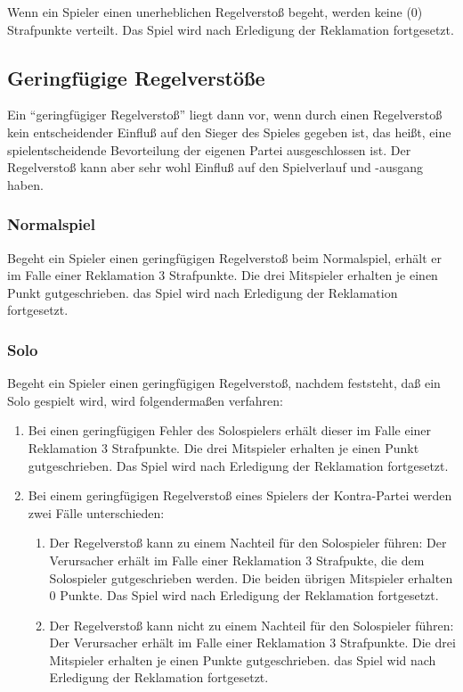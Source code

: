 \documentclass[12pt]{scrartcl}
\begin{document}
Wenn ein Spieler einen unerheblichen Regelverstoß begeht, werden
keine (0) Strafpunkte verteilt. Das Spiel wird nach Erledigung
der Reklamation fortgesetzt.

\subsection{Geringfügige Regelverstöße}
Ein "`geringfügiger Regelverstoß"' liegt dann vor, wenn durch
einen Regelverstoß kein entscheidender Einfluß auf den Sieger
des Spieles gegeben ist, das heißt, eine spielentscheidende
Bevorteilung der eigenen Partei ausgeschlossen ist. Der
Regelverstoß kann aber sehr wohl Einfluß auf den Spielverlauf
und -ausgang haben.

\subsubsection{Normalspiel}
Begeht ein Spieler einen geringfügigen Regelverstoß
beim Normalspiel, erhält er im Falle einer Reklamation 3
Strafpunkte. Die drei Mitspieler erhalten je einen Punkt
gutgeschrieben. das Spiel wird nach Erledigung der Reklamation
fortgesetzt.

\subsubsection{Solo}
Begeht ein Spieler einen geringfügigen Regelverstoß,
nachdem feststeht, daß ein Solo gespielt wird, wird
folgendermaßen verfahren:
\begin{enumerate}
  \item
    Bei einen geringfügigen Fehler des Solospielers erhält dieser
    im Falle einer Reklamation 3 Strafpunkte. Die drei Mitspieler
    erhalten je einen Punkt gutgeschrieben. Das Spiel wird nach
    Erledigung der Reklamation fortgesetzt.
  \item
    Bei einem geringfügigen Regelverstoß eines Spielers der
    Kontra-Partei werden zwei Fälle unterschieden:
    \begin{enumerate}
      \item
	Der Regelverstoß kann zu einem Nachteil für den Solospieler
	führen: Der Verursacher erhält im Falle einer Reklamation 3
	Strafpukte, die dem Solospieler gutgeschrieben werden. Die beiden
	übrigen Mitspieler erhalten 0 Punkte. Das Spiel wird nach
	Erledigung der Reklamation fortgesetzt.
      \item
	Der Regelverstoß kann nicht zu einem Nachteil für den
	Solospieler führen: Der Verursacher erhält im Falle einer
	Reklamation 3 Strafpunkte. Die drei Mitspieler erhalten je einen
	Punkte gutgeschrieben. das Spiel wid nach Erledigung der
	Reklamation fortgesetzt.
    \end{enumerate}
\end{enumerate}
\end{document}
